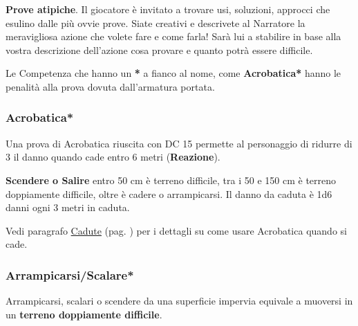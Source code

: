 \begin{multicols}{2}
\textbf{Prove atipiche}. Il giocatore è invitato a trovare usi, soluzioni, approcci che esulino dalle più ovvie prove. Siate creativi e descrivete al Narratore la meravigliosa azione che volete fare e come farla! Sarà lui a stabilire in base alla vostra descrizione dell'azione cosa provare e quanto potrà essere difficile.

Le Competenza che hanno un \textbf{*} a fianco al nome, come \textbf{Acrobatica*} hanno le penalità alla prova dovuta dall'armatura portata.

\titlespacing*{\subsubsection}{0pt}{0.5em}{0.5em}\subsubsection*{Acrobatica*} \label{acrobatica}
Una prova di Acrobatica riuscita con DC 15 permette al personaggio di ridurre di 3 il danno quando cade entro 6 metri (\textbf{Reazione}).

\textbf{Scendere o Salire} entro 50 cm è terreno difficile, tra i 50 e 150 cm è terreno doppiamente difficile, oltre è cadere o arrampicarsi. Il danno da caduta è 1d6 danni ogni 3 metri in caduta. 

Vedi paragrafo \hyperlink{cadute}{Cadute} (pag. \pageref{cadute}) per i dettagli su come usare Acrobatica quando si cade.

\titlespacing*{\subsubsection}{0pt}{0.5em}{0.5em}\subsubsection*{Arrampicarsi/Scalare*} \label{arrampicarsi}

Arrampicarsi, scalari o scendere da una superficie impervia equivale a muoversi in un \textbf{terreno doppiamente difficile}.

\medskip


\end{multicols}
